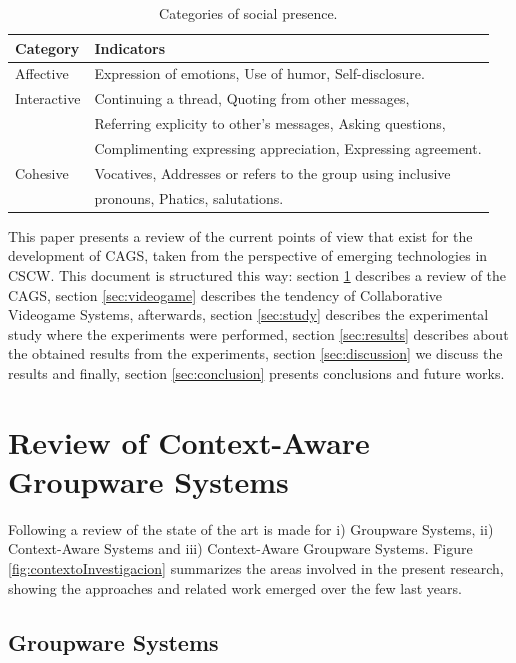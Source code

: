 \documentclass[conference]{./sty/IEEEtran}
\begin{document}
\begin{table}[htbp]
	\centering
	\begin{tabular}{ll}
			\hline
		 	Category & Indicators \\
			\hline
			 Affective & Expression of emotions, Use of humor, Self-disclosure.   \\
			 Interactive &  Continuing a thread, Quoting from other messages,   \\
			 & Referring explicity  to other's messages, Asking questions, \\
			 & Complimenting expressing appreciation, Expressing agreement.   \\
			 Cohesive & Vocatives, Addresses or refers to the group using inclusive \\
			 & pronouns, Phatics, salutations. \\
			\hline	 
	\end{tabular}
	\caption{Categories of social presence.}
	\label{tab:socialPresence}
\end{table}

This paper presents a review of the current points of view that exist for the development of CAGS, taken from the perspective of emerging technologies in CSCW. This document is structured this way: section \ref{sec:review} describes a review of the CAGS, section \ref{sec:videogame} describes the tendency of Collaborative Videogame Systems, afterwards, section \ref{sec:study} describes the experimental study where the experiments were performed, section \ref{sec:results} describes about the obtained results from the experiments, section \ref{sec:discussion} we discuss the results and finally, section \ref{sec:conclusion} presents conclusions and future works.

\section{Review of Context-Aware Groupware Systems} 
\label{sec:review}
Following a review of the state of the art is made for i) Groupware Systems, ii) Context-Aware Systems and iii) Context-Aware Groupware Systems. Figure \ref{fig:contextoInvestigacion} summarizes the areas involved in the present research, showing the approaches and related work emerged over the few last years.

\subsection{Groupware Systems}
\end{document}

